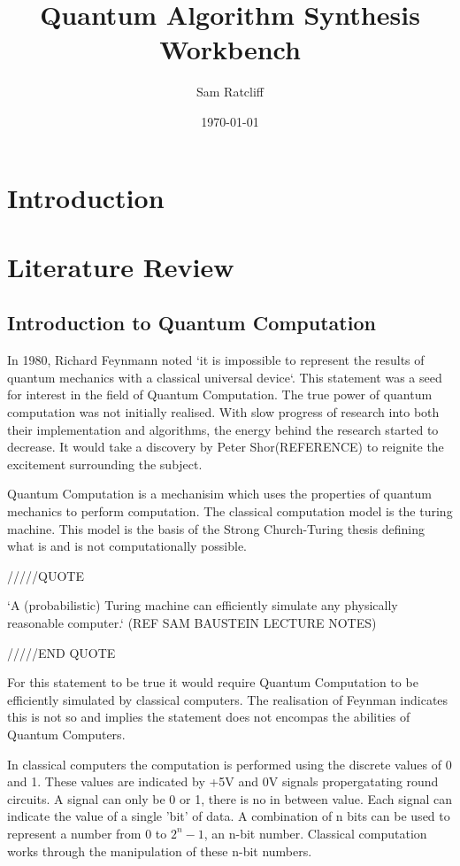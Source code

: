 \documentclass[authoryearcitations]{UoYCSproject}
\author{Sam Ratcliff}
\title{Quantum Algorithm Synthesis Workbench}
\date{\today}
\begin{document}
\maketitle

\chapter{Introduction}
\chapter{Literature Review}
\section{Introduction to Quantum Computation}
In 1980, Richard Feynmann noted `it is impossible to represent the results of quantum mechanics with a classical universal device`\cite{Feynman82simulatingphysics}.
This statement was a seed for interest in the field of Quantum Computation.
The true power of quantum computation was not initially realised.
With slow progress of research into both their implementation and algorithms, the energy behind the research started to decrease.
It would take a discovery by Peter Shor(REFERENCE) to reignite the excitement surrounding the subject.  

Quantum Computation is a mechanisim which uses the properties of quantum mechanics to perform computation.
The classical computation model is the turing machine.
This model is the basis of the Strong Church-Turing thesis defining what is and is not computationally possible.

/////QUOTE

`A (probabilistic) Turing machine can efficiently simulate any physically reasonable computer.` (REF SAM BAUSTEIN LECTURE NOTES)

/////END QUOTE

For this statement to be true it would require Quantum Computation to be efficiently simulated by classical computers.
The realisation of Feynman indicates this is not so and implies the statement does not encompas the abilities of Quantum Computers.



In classical computers the computation is performed using the discrete values of 0 and 1.
These values are indicated by +5V and 0V signals propergatating round circuits.
A signal can only be 0 or 1, there is no in between value.
Each signal can indicate the value of a single 'bit' of data.
A combination of n bits can be used to represent a number from $0$ to $2^n-1$, an n-bit number.
Classical computation works through the manipulation of these n-bit numbers.
\end{document}
